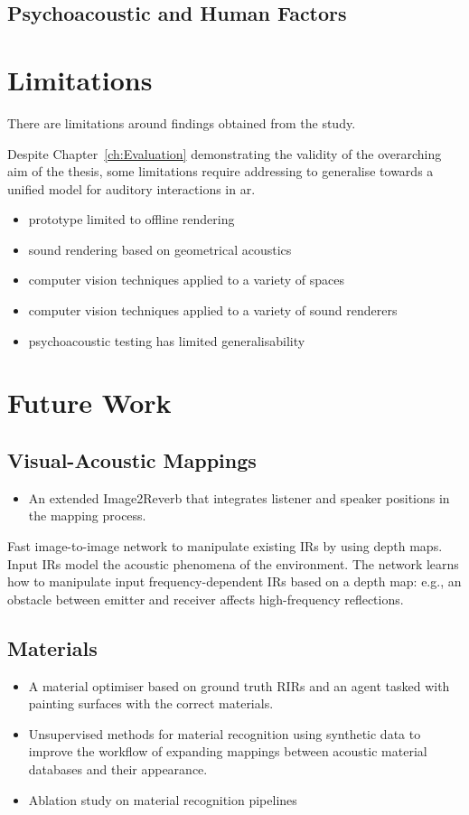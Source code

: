 \subsection{Psychoacoustic and Human Factors}

\section{Limitations}
There are limitations around findings obtained from the study.

Despite Chapter~\ref{ch:Evaluation} demonstrating the validity of the overarching aim of the thesis, some limitations require addressing to generalise towards a unified model for auditory interactions in \acrshort{ar}.

\begin{itemize}
    \item prototype limited to offline rendering
    \item sound rendering based on geometrical acoustics
    \item computer vision techniques applied to a variety of spaces
    \item computer vision techniques applied to a variety of sound renderers
    \item psychoacoustic testing has limited generalisability
\end{itemize}

\section{Future Work}

\subsection{Visual-Acoustic Mappings}
\begin{itemize}
    \item An extended Image2Reverb that integrates listener and speaker positions in the mapping process.
\end{itemize}

Fast image-to-image network to manipulate existing IRs by using depth maps. Input IRs model the acoustic phenomena of the environment. The network learns how to manipulate input frequency-dependent IRs based on a depth map: e.g., an obstacle between emitter and receiver affects high-frequency reflections.

\subsection{Materials}
\begin{itemize}
    \item A material optimiser based on ground truth RIRs and an agent tasked with painting surfaces with the correct materials.
    \item Unsupervised methods for material recognition using synthetic data to improve the workflow of expanding mappings between acoustic material databases and their appearance.
    \item Ablation study on material recognition pipelines
\end{itemize}

